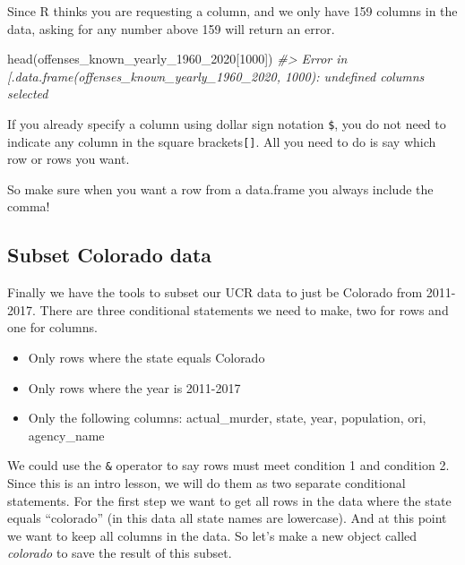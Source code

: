 \documentclass[
]{krantz}
\makeatletter
\newenvironment{Shaded}{\begin{snugshade}}{\end{snugshade}}
\newcommand{\CommentTok}[1]{\textcolor[rgb]{0.37,0.37,0.37}{\textit{#1}}}
\newcommand{\DecValTok}[1]{\textcolor[rgb]{0.06,0.06,0.06}{#1}}
\newcommand{\FunctionTok}[1]{\textcolor[rgb]{0,0,0}{#1}}
\newcommand{\NormalTok}[1]{#1}
\newcommand{\SpecialCharTok}[1]{\textcolor[rgb]{0,0,0}{#1}}
\providecommand{\tightlist}{%
  \setlength{\itemsep}{0pt}\setlength{\parskip}{0pt}}
\newenvironment{kframe}{%
\medskip{}
\setlength{\fboxsep}{.8em}
 \def\at@end@of@kframe{}%
 \ifinner\ifhmode%
  \def\at@end@of@kframe{\end{minipage}}%
  \begin{minipage}{\columnwidth}%
 \fi\fi%
 \def\FrameCommand##1{\hskip\@totalleftmargin \hskip-\fboxsep
 \colorbox{shadecolor}{##1}\hskip-\fboxsep
     \hskip-\linewidth \hskip-\@totalleftmargin \hskip\columnwidth}%
 \MakeFramed {\advance\hsize-\width
   \@totalleftmargin\z@ \linewidth\hsize
   \@setminipage}}%
 {\par\unskip\endMakeFramed%
 \at@end@of@kframe}
\renewenvironment{Shaded}{\begin{kframe}}{\end{kframe}}
\makeatother
\begin{document}
Since R thinks you are requesting a column, and we only have 159 columns in the data, asking for any number above 159 will return an error.

\begin{Shaded}
\begin{Highlighting}[]
\FunctionTok{head}\NormalTok{(offenses\_known\_yearly\_1960\_2020[}\DecValTok{1000}\NormalTok{])}
\CommentTok{\#\textgreater{} Error in \textasciigrave{}[.data.frame\textasciigrave{}(offenses\_known\_yearly\_1960\_2020, 1000): undefined columns selected}
\end{Highlighting}
\end{Shaded}

If you already specify a column using dollar sign notation \texttt{\$}, you do not need to indicate any column in the square brackets\texttt{{[}{]}}. All you need to do is say which row or rows you want.

\begin{Shaded}
\end{Shaded}

So make sure when you want a row from a data.frame you always include the comma!

\hypertarget{subset-colorado-data}{%
\subsection{Subset Colorado data}\label{subset-colorado-data}}

Finally we have the tools to subset our UCR data to just be Colorado from 2011-2017. There are three conditional statements we need to make, two for rows and one for columns.

\begin{itemize}
\tightlist
\item
  Only rows where the state equals Colorado
\item
  Only rows where the year is 2011-2017
\item
  Only the following columns: actual\_murder, state, year, population, ori, agency\_name
\end{itemize}

We could use the \texttt{\&} operator to say rows must meet condition 1 and condition 2. Since this is an intro lesson, we will do them as two separate conditional statements. For the first step we want to get all rows in the data where the state equals ``colorado'' (in this data all state names are lowercase). And at this point we want to keep all columns in the data. So let's make a new object called \emph{colorado} to save the result of this subset.
\end{document}
